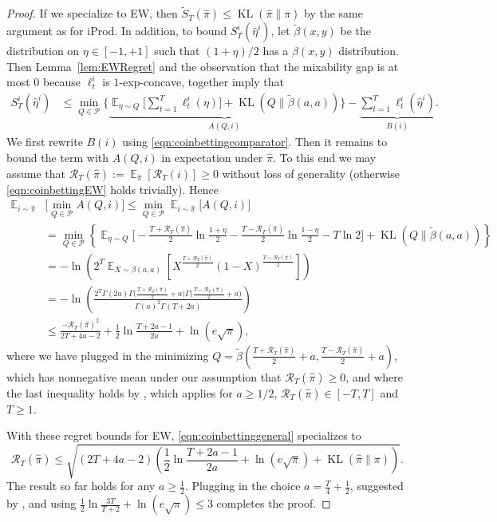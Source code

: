 \documentclass{colt2018} %
\DeclareMathOperator*{\E}{\mathbb{E}}
\DeclareMathOperator{\kl}{KL}
\newcommand{\half}{\frac{1}{2}}
\newcommand{\domainP}{\mathcal{P}}
\newcommand{\sloss}{\ell}                       %
\newcommand{\sregret}{S}                        %
\newcommand{\altsregret}{\tilde{S}}             %
\newcommand{\altbeta}{\tilde{\beta}}            %
\newcommand{\etaopt}{\hat{\eta}}                %
\newcommand{\postpi}{\hat{\pi}}                 %
\newcommand{\regret}{\mathcal{R}}
\begin{document}
\begin{proof}
If we specialize to EW, then $\altsregret_T(\postpi) \leq
\kl(\postpi\|\pi)$ by the same argument as for iProd. In addition, to
bound $\sregret_T^i(\etaopt^i)$, let $\altbeta(x,y)$ be the distribution
on $\eta \in [-1,+1]$ such that $(1+\eta)/2$ has a $\beta(x,y)$
distribution. Then Lemma~\ref{lem:EWRegret} and the observation that the
mixability gap is at most $0$ because $\ell_t^i$ is $1$-exp-concave,
together imply that 
% 
\begin{align*}
  \sregret_T^i(\etaopt^i)
    &\leq \min_{Q \in \domainP} \Big\{\underbrace{\E_{\eta \sim
    Q}\big[\sum_{t=1}^T \sloss_t^i(\eta)\big] + \kl(Q \|
    \altbeta(a,a))}_{A(Q,i)}\Big\} - \underbrace{\sum_{t=1}^T
    \sloss_t^i(\etaopt^i)}_{B(i)}.
\end{align*}
% 
We first rewrite $B(i)$ using \eqref{eqn:coinbettingcomparator}. Then it
remains to bound the term with $A(Q,i)$ in expectation under $\postpi$.
To this end we may assume that $\regret_T(\postpi) :=
\E_{\postpi}[\regret_T(i)] \geq 0$ without loss of generality (otherwise
\eqref{eqn:coinbettingEW} holds trivially). Hence 
% 
\begin{align*}
  \E_{i \sim \postpi}&\big[\min_{Q \in \domainP} A(Q,i)\big]
    \leq \min_{Q \in \domainP} \E_{i \sim \postpi}\big[A(Q,i)\big]\\
    &= \min_{Q \in \domainP} \left\{\E_{\eta \sim Q}\Big[
    -\frac{T+\regret_T(\postpi)}{2} \ln \frac{1+\eta}{2}
      -\frac{T-\regret_T(\postpi)}{2} \ln \frac{1-\eta}{2}
      -T\ln 2\Big] + \kl(Q \| \altbeta(a,a))\right\}\\
    &= -\ln \left(2^T \E_{X \sim \beta(a,a)}\left[X^{\frac{T+\regret_T(\postpi)}{2}}
    (1-X)^{\frac{T-\regret_T(\postpi)}{2}}\right]\right)\\
    &= -\ln \left(\frac{2^T \Gamma(2a)\Gamma\big(\frac{T+\regret_T(\postpi)}{2} +
    a\big)\Gamma\big(\frac{T-\regret_T(\postpi)}{2} + a\big)}{\Gamma(a)^2\Gamma(T+2a)}\right)\\
    &\leq \frac{-\regret_T(\postpi)^2}{2T+4a-2} + \half \ln
    \frac{T+2a-1}{2a}+\ln(e\sqrt{\pi}),
\end{align*}
% 
where we have plugged in the minimizing $Q =
\altbeta(\frac{T+\regret_T(\postpi)}{2} +
a,\frac{T-\regret_T(\postpi)}{2} + a)$, which has nonnegative mean under
our assumption that $\regret_T(\postpi) \geq 0$, and where the last
inequality holds by \citep[Lemma~16]{OrabonaPal2016}, which applies for
$a \geq 1/2$, $\regret_T(\postpi) \in [-T,T]$ and $T \geq 1$.

With these regret bounds for EW, \eqref{eqn:coinbettinggeneral}
specializes to
% 
\[
  \regret_T(\postpi)
    \leq \sqrt{(2T+4a-2)\left(\half \ln \frac{T+2a-1}{2a}+\ln(e\sqrt{\pi}) +
    \kl(\postpi\|\pi)\right)}.
\]
% 
The result so far holds for any $a \geq \half$. Plugging in the choice
$a = \frac{T}{4} + \half$, suggested by \citet{OrabonaPal2016}, and
using $\half \ln \frac{3T}{T+2}+\ln(e\sqrt{\pi}) \leq 3$ completes
the proof.
\end{proof}
\end{document}
